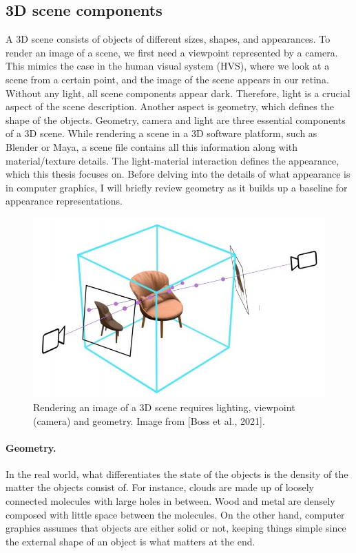 \subsection{3D scene components}

A 3D scene consists of objects of different sizes, shapes, and appearances. To render an image of a scene, we first need a viewpoint represented by a camera. This mimics the case in the human visual system (\gls{HVS}), where we look at a scene from a certain point, and the image of the scene appears in our retina. Without any light, all scene components appear dark. Therefore, light is a crucial aspect of the scene description. Another aspect is geometry, which defines the shape of the objects. Geometry, camera and light are three essential components of a 3D scene. While rendering a scene in a 3D software platform, such as Blender or Maya, a scene file contains all this information along with material/texture details. The light-material interaction defines the appearance, which this thesis focuses on. Before delving into the details of what appearance is in computer graphics, I will briefly review geometry as it builds up a baseline for appearance representations.

\begin{figure}
  \centering
   \includegraphics[width=\linewidth]{Images/scene_with_camera.jpg}
   \caption{Rendering an image of a 3D scene requires lighting, viewpoint (camera) and geometry. Image from [Boss et al., 2021].}
   \label{fig:teaser}
\end{figure}


\paragraph{Geometry.} In the real world, what differentiates the state of the objects is the density of the matter the objects consist of. For instance, clouds are made up of loosely connected molecules with large holes in between. Wood and metal are densely composed with little space between the molecules. On the other hand, computer graphics assumes that objects are either solid or not, keeping things simple since the external shape of an object is what matters at the end. 


